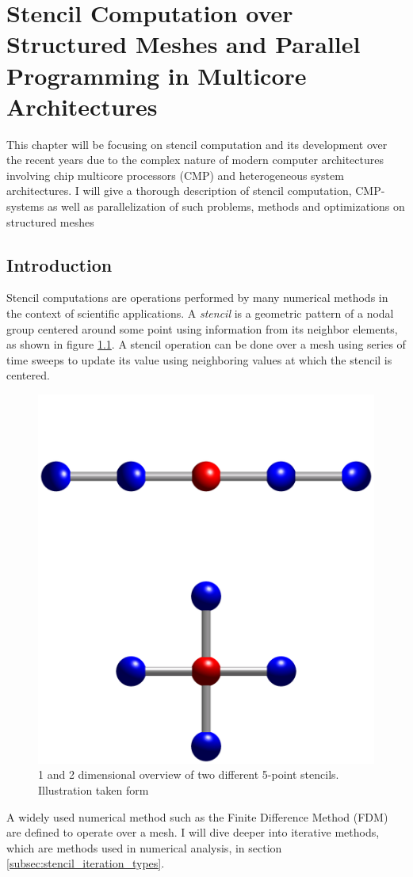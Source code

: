 \chapter{Stencil Computation over Structured Meshes and Parallel Programming in Multicore Architectures}
This chapter will be focusing on stencil computation and its development over the recent years due to the complex nature of modern computer architectures involving chip multicore processors (CMP) and heterogeneous system architectures. I will give a thorough description of stencil computation, CMP-systems as well as parallelization of such problems, methods and optimizations on structured meshes


\section{Introduction}
Stencil computations are operations performed by many numerical methods in the context of scientific  applications. A \textit{stencil} is a geometric pattern of a nodal group centered around some point using information from its neighbor elements, as shown in figure \ref{I_Five_point_stencil_illustration.png}. A stencil operation can be done over a mesh using series of time sweeps to update its value using neighboring values at which the stencil is centered.
\begin{figure}[h]
 \centering 
     \includegraphics[height=0.5\textwidth]{bilder/I_Five_point_stencil_illustration}
     \caption{1 and 2 dimensional overview of two different 5-point stencils. Illustration taken form \cite{pic1}
     \label{I_Five_point_stencil_illustration.png}}
\end{figure}
A widely used numerical method such as the Finite Difference Method (FDM) are defined to operate over a mesh. I will dive deeper into iterative methods, which are methods used in numerical analysis, in section \ref{subsec:stencil_iteration_types}. 

